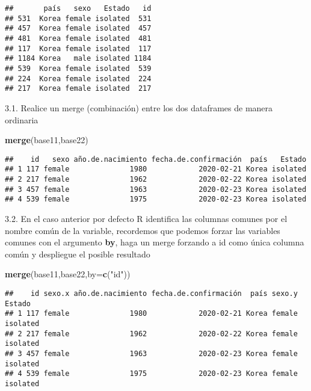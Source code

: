 \documentclass[]{article}
\newenvironment{Shaded}{\begin{snugshade}}{\end{snugshade}}
\newcommand{\KeywordTok}[1]{\textcolor[rgb]{0.13,0.29,0.53}{\textbf{#1}}}
\newcommand{\DataTypeTok}[1]{\textcolor[rgb]{0.13,0.29,0.53}{#1}}
\newcommand{\StringTok}[1]{\textcolor[rgb]{0.31,0.60,0.02}{#1}}
\newcommand{\NormalTok}[1]{#1}
\begin{document}
\begin{verbatim}
##       país   sexo   Estado   id
## 531  Korea female isolated  531
## 457  Korea female isolated  457
## 481  Korea female isolated  481
## 117  Korea female isolated  117
## 1184 Korea   male isolated 1184
## 539  Korea female isolated  539
## 224  Korea female isolated  224
## 217  Korea female isolated  217
\end{verbatim}

3.1. Realice un merge (combinación) entre los dos dataframes de manera
ordinaria

\begin{Shaded}
\begin{Highlighting}[]
\KeywordTok{merge}\NormalTok{(base11,base22)}
\end{Highlighting}
\end{Shaded}

\begin{verbatim}
##    id   sexo año.de.nacimiento fecha.de.confirmación  país   Estado
## 1 117 female              1980            2020-02-21 Korea isolated
## 2 217 female              1962            2020-02-22 Korea isolated
## 3 457 female              1963            2020-02-23 Korea isolated
## 4 539 female              1975            2020-02-23 Korea isolated
\end{verbatim}

3.2. En el caso anterior por defecto R identifica las columnas comunes
por el nombre común de la variable, recordemos que podemos forzar las
variables comunes con el argumento \textbf{by}, haga un merge forzando a
id como única columna común y despliegue el posible resultado

\begin{Shaded}
\begin{Highlighting}[]
\KeywordTok{merge}\NormalTok{(base11,base22,}\DataTypeTok{by=}\KeywordTok{c}\NormalTok{(}\StringTok{"id"}\NormalTok{))}
\end{Highlighting}
\end{Shaded}

\begin{verbatim}
##    id sexo.x año.de.nacimiento fecha.de.confirmación  país sexo.y   Estado
## 1 117 female              1980            2020-02-21 Korea female isolated
## 2 217 female              1962            2020-02-22 Korea female isolated
## 3 457 female              1963            2020-02-23 Korea female isolated
## 4 539 female              1975            2020-02-23 Korea female isolated
\end{verbatim}
\end{document}
